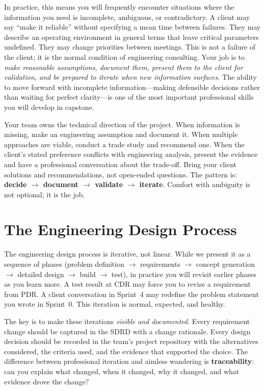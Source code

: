 In practice, this means you will frequently encounter situations where the information you need is incomplete, ambiguous, or contradictory. A client may say ``make it reliable'' without specifying a mean time between failures. They may describe an operating environment in general terms that leave critical parameters undefined. They may change priorities between meetings. This is not a failure of the client; it is the normal condition of engineering consulting. Your job is to \emph{make reasonable assumptions, document them, present them to the client for validation, and be prepared to iterate when new information surfaces}. The ability to move forward with incomplete information---making defensible decisions rather than waiting for perfect clarity---is one of the most important professional skills you will develop in capstone.

\begin{keyconceptbox}
Your team owns the technical direction of the project. When information is missing, make an engineering assumption and document it. When multiple approaches are viable, conduct a trade study and recommend one. When the client's stated preference conflicts with engineering analysis, present the evidence and have a professional conversation about the trade-off. Bring your client solutions and recommendations, not open-ended questions. The pattern is: \textbf{decide $\to$ document $\to$ validate $\to$ iterate}. Comfort with ambiguity is not optional; it is the job.
\end{keyconceptbox}


\section{The Engineering Design Process}
The engineering design process is iterative, not linear. While we present it as a sequence of phases (problem definition $\to$ requirements $\to$ concept generation $\to$ detailed design $\to$ build $\to$ test), in practice you will revisit earlier phases as you learn more. A test result at CDR may force you to revise a requirement from PDR. A client conversation in Sprint~4 may redefine the problem statement you wrote in Sprint~0. This iteration is normal, expected, and healthy.

The key is to make these iterations \emph{visible and documented}. Every requirement change should be captured in the SDRD with a change rationale. Every design decision should be recorded in the team's project repository with the alternatives considered, the criteria used, and the evidence that supported the choice. The difference between professional iteration and aimless wandering is \textbf{traceability}: can you explain what changed, when it changed, why it changed, and what evidence drove the change?

